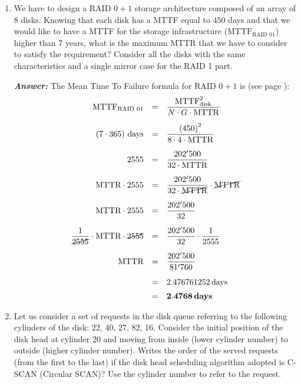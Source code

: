 \begin{enumerate}
    \item We have to design a RAID $0+1$ storage architecture composed of an array of 8 disks. Knowing that each disk has a MTTF equal to $450$ days and that we would like to have a MTTF for the storage infrastructure ($\text{MTTF}_{\text{RAID 01}}$) higher than 7 years, what is the maximum MTTR that we have to consider to satisfy the requirement? Consider all the disks with the same characteristics and a single mirror case for the RAID 1 part.

    \textcolor{Green3}{\textbf{\emph{Answer:}}} The Mean Time To Failure formula for RAID $0+1$ is (see page \pageref{eq: RAID 01 - MTTF}):
    \begin{equation*}
        \begin{array}{rcl}
            \text{MTTF}_{\text{RAID 01}} &=& \dfrac{\text{MTTF}_{\text{disk}}^{2}}{N \cdot G \cdot \text{MTTR}} \\ [1.3em]
            \left(7 \cdot 365\right) \, \text{days} &=& \dfrac{\left(450\right)^{2}}{8 \cdot 4 \cdot \text{MTTR}} \\ [1.3em]
            2555 &=& \dfrac{202'500}{32 \cdot \text{MTTR}} \\ [1.3em]
            \text{MTTR} \cdot 2555 &=& \dfrac{202'500}{32 \cdot \cancel{\text{MTTR}}} \cdot \cancel{\text{MTTR}} \\ [1.3em]
            \text{MTTR} \cdot 2555 &=& \dfrac{202'500}{32} \\ [1.3em]
            \dfrac{1}{\cancel{2555}} \cdot \text{MTTR} \cdot \cancel{2555} &=& \dfrac{202'500}{32} \cdot \dfrac{1}{2555} \\ [1.3em]
            \text{MTTR} &=& \dfrac{202'500}{81'760} \\ [1.3em]
            &=& 2.476761252 \, \text{days} \\ [.5em]
            &=& \mathbf{2.4768} \, \textbf{days}
        \end{array}
    \end{equation*}


    \item Let us consider a set of requests in the disk queue referring to the following cylinders of the disk: 22, 40, 27, 82, 16. Consider the initial position of the disk head at cylinder 20 and moving from inside (lower cylinder number) to outside (higher cylinder number). Writes the order of the served requests (from the ﬁrst to the last) if the disk head scheduling algorithm adopted is C-SCAN (Circular SCAN)? Use the cylinder number to refer to the request.
    

\end{enumerate}
